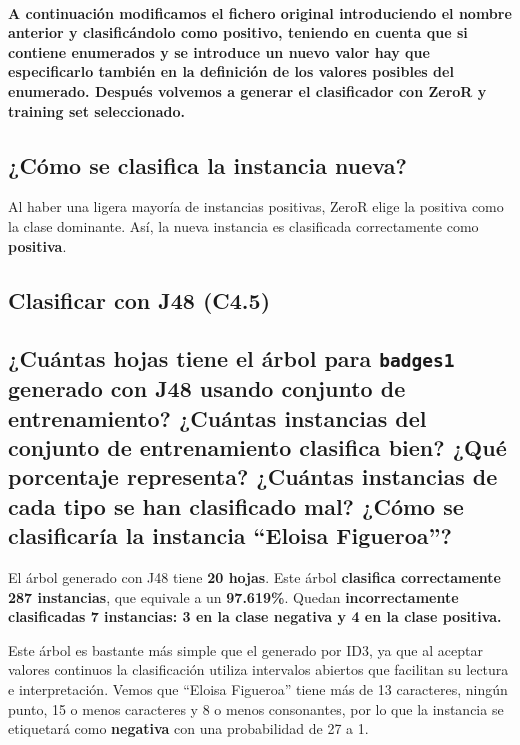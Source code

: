 \documentclass[12pt]{article}
\begin{document}
\paragraph{\small A continuación modificamos el fichero original introduciendo
el nombre anterior y clasificándolo como positivo, teniendo en cuenta que
si contiene enumerados y se introduce un nuevo valor hay que especificarlo
también en la definición de los valores posibles del enumerado. Después
volvemos a generar el clasificador con ZeroR y training set seleccionado.}

\subsection*{\small ¿Cómo se clasifica la instancia nueva?}

Al haber una ligera mayoría de instancias positivas, ZeroR elige la positiva
como la clase dominante. Así, la nueva instancia es clasificada correctamente
como \textbf{positiva}.

\newpage

\begin{center}
\section{Clasificar con J48 (C4.5)}
\end{center}

\subsection*{\small ¿Cuántas hojas tiene el árbol para \texttt{badges1}
generado con J48 usando conjunto de entrenamiento? ¿Cuántas instancias del
conjunto de entrenamiento clasifica bien? ¿Qué porcentaje representa? ¿Cuántas
instancias de cada tipo se han clasificado mal? ¿Cómo se clasificaría la
instancia ``Eloisa Figueroa''?}

El árbol generado con J48 tiene \textbf{20 hojas}. Este árbol \textbf{clasifica
correctamente 287 instancias}, que equivale a un \textbf{97.619\%}. Quedan
\textbf{incorrectamente clasificadas 7 instancias: 3 en la clase negativa y 4
en la clase positiva.}

Este árbol es bastante más simple que el generado por ID3, ya que al aceptar
valores continuos la clasificación utiliza intervalos abiertos que facilitan su
lectura e interpretación. Vemos que ``Eloisa Figueroa'' tiene más de 13
caracteres, ningún punto, 15 o menos caracteres y 8 o menos consonantes, por lo
que la instancia se etiquetará como \textbf{negativa} con una probabilidad de
27 a 1.
\end{document}

